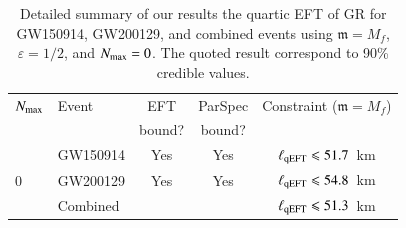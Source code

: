 \documentclass[twocolumn,
               prd,
               aps,
               superscriptaddress,
               tightenlines,
               nofootinbib,
               eqsecnum,
               amsfonts,
               amsmath,
               longbibliography]{revtex4-1}
\newcommand{\gm}{\mathfrak{m}}
\begin{document}
\begin{table}[h]
\begin{tabular}{l l c c c}
\hline
\hline
$N_{\rm max}$ & Event & EFT    & ParSpec & Constraint ($\gm = M_{f}$) \\
              &       & bound? & bound?  &                            \\
\hline
  & GW150914 & Yes & Yes  & $\ell_{\rm qEFT} \leqslant 51.7$~km \\
0 & GW200129 & Yes & Yes  & $\ell_{\rm qEFT} \leqslant 54.8$~km \\
  & Combined &     &      & \cellcolor{black!10}$\ell_{\rm qEFT} \leqslant 51.3$~km \\
\hline
\hline
\end{tabular}
\caption{Detailed summary of our results the quartic EFT of GR for GW150914, GW200129, and
combined events using $\gm = M_{f}$, $\varepsilon = 1/2$, and $N_{\rm max} = 0$. The quoted
result correspond to 90\% credible values.
}
\label{tab:summary_qeft}
\end{table}

%
\end{document}
